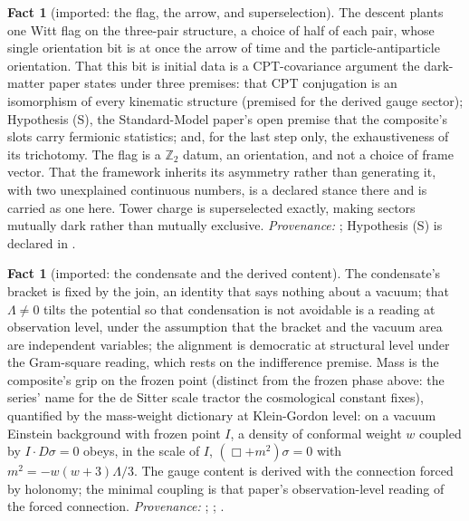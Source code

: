 \documentclass[11pt]{article}
\theoremstyle{definition}
\newtheorem{fact}[theorem]{Fact}
\begin{document}
\begin{fact}[imported: the flag, the arrow, and superselection]\label{fact:flag}
The descent plants one Witt flag on the three-pair structure, a choice of half of each pair, whose single orientation bit is at once the arrow of time and the particle-antiparticle orientation. That this bit is initial data is a CPT-covariance argument the dark-matter paper states under three premises: that CPT conjugation is an isomorphism of every kinematic structure (premised for the derived gauge sector); Hypothesis (S), the Standard-Model paper's open premise that the composite's slots carry fermionic statistics; and, for the last step only, the exhaustiveness of its trichotomy. The flag is a $\mathbb{Z}_{2}$ datum, an orientation, and not a choice of frame vector. That the framework inherits its asymmetry rather than generating it, with two unexplained continuous numbers, is a declared stance there and is carried as one here. Tower charge is superselected exactly, making sectors mutually dark rather than mutually exclusive. \emph{Provenance:} \cite[Def.~2.10, Prop.~4.1, Prop.~5.1 (stance), Prop.~5.2 (under its three premises)]{ButlerT14}; Hypothesis (S) is declared in \cite[\S5]{ButlerT12}.
\end{fact}

\begin{fact}[imported: the condensate and the derived content]\label{fact:condensate}
The condensate's bracket is fixed by the join, an identity that says nothing about a vacuum; that $\Lambda \neq 0$ tilts the potential so that condensation is not avoidable is a reading at observation level, under the assumption that the bracket and the vacuum area are independent variables; the alignment is democratic at structural level under the Gram-square reading, which rests on the indifference premise. Mass is the composite's grip on the frozen point (distinct from the frozen phase above: the series' name for the de Sitter scale tractor the cosmological constant fixes), quantified by the mass-weight dictionary at Klein-Gordon level: on a vacuum Einstein background with frozen point $I$, a density of conformal weight $w$ coupled by $I \cdot D\sigma = 0$ obeys, in the scale of $I$, $(\Box + m^{2})\sigma = 0$ with $m^{2} = -w(w+3)\Lambda/3$. The gauge content is derived with the connection forced by holonomy; the minimal coupling is that paper's observation-level reading of the forced connection. \emph{Provenance:} \cite[Prop.~4.1, Prop.~4.2(2), Prop.~4.3(3)]{ButlerT13}; \cite[Thm.~3.1, Lem.~5.1, Def.~5.4, Thm.~5.6]{ButlerT11}; \cite[Prop.~5.7 and the paragraph following it]{ButlerT12}.
\end{fact}
\end{document}
